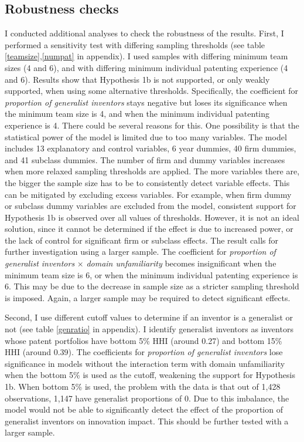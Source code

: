 \documentclass{article}
\begin{document}
\subsection{Robustness checks}
I conducted additional analyses to check the robustness of the results. First, I performed a sensitivity test with differing sampling thresholds (see table \ref{teamsize},\ref{numpat} in appendix). I used samples with differing minimum team sizes (4 and 6), and with differing minimum individual patenting experience (4 and 6). Results show that Hypothesis 1b is not supported, or only weakly supported, when using some alternative thresholds. Specifically, the coefficient for \textit{proportion of generalist inventors} stays negative but loses its significance when the minimum team size is 4, and when the minimum individual patenting experience is 4. 
There could be several reasons for this. One possibility is that the statistical power of the model is limited due to too many variables. The model includes 13 explanatory and control variables, 6 year dummies, 40 firm dummies, and 41 subclass dummies. The number of firm and dummy variables increases when more relaxed sampling thresholds are applied. The more variables there are, the bigger the sample size has to be to consistently detect variable effects. This can be mitigated by excluding excess variables. For example, when firm dummy or subclass dummy variables are excluded from the model, consistent support for Hypothesis 1b is observed over all values of thresholds. However, it is not an ideal solution, since it cannot be determined if the effect is due to increased power, or the lack of control for significant firm or subclass effects. The result calls for further investigation using a larger sample.
The coefficient for \textit{proportion of generalist inventors} $\times$ \textit{domain unfamiliarity} becomes insignificant when the minimum team size is 6, or when the minimum individual patenting experience is 6. This may be due to the decrease in sample size as a stricter sampling threshold is imposed. Again, a larger sample may be required to detect significant effects.


Second, I use different cutoff values to determine if an inventor is a generalist or not (see table \ref{genratio} in appendix). I identify generalist inventors as inventors whose patent portfolios have bottom 5\% HHI (around 0.27) and bottom 15\% HHI (around 0.39).
The coefficients for \textit{proportion of generalist inventors} lose significance in models without the interaction term with domain unfamiliarity when the bottom 5\% is used as the cutoff, weakening the support for Hypothesis 1b. When bottom 5\% is used, the problem with the data is that out of 1,428 observations, 1,147 have generalist proportions of 0. Due to this imbalance, the model would not be able to significantly detect the effect of the proportion of generalist inventors on innovation impact. This should be further tested with a larger sample.
\end{document}
